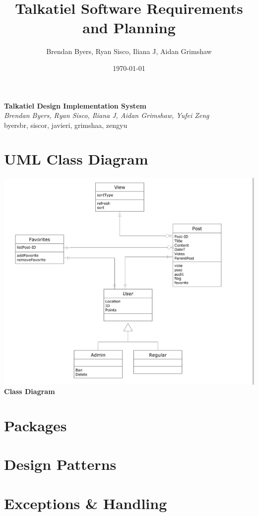 \documentclass[12pt]{article}
\title{Talkatiel Software Requirements and Planning}
\author{Brendan Byers, Ryan Sisco, Iliana J, Aidan Grimshaw}
\date{\today}
\begin{document}
\begin{center}
      \Large\textbf{Talkatiel Design Implementation System}\\
      \large\textit{Brendan Byers, Ryan Sisco, Iliana J, Aidan Grimshaw, Yufei Zeng}\\
      \large{byersbr, siscor, javieri, grimshaa, zengyu}\\
   \end{center}

\tableofcontents

\section{UML Class Diagram}
\begin{center}
\includegraphics[scale=0.25]{img/uml/ClassDiagram}\linebreak
\textbf{Class Diagram}
  \end{center}

\section{Packages}

\section{Design Patterns}

\section{Exceptions & Handling}
\end{document}
